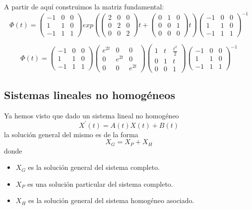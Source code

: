\begin{example}
A partir de aquí construimos la matriz fundamental:
$$\Phi(t) = \begin{pmatrix}
-1 & 0 & 0\\ 1 & 1 & 0\\-1& 1& 1
\end{pmatrix}exp(\begin{pmatrix}
2 & 0 & 0\\ 0 & 2 & 0\\0& 0& 2
\end{pmatrix}t+\begin{pmatrix}
0 & 1 & 0\\ 0 & 0 & 1\\0& 0& 0
\end{pmatrix}t)\begin{pmatrix}
-1 & 0 & 0\\ 1 & 1 & 0\\-1& 1& 1
\end{pmatrix}^{-1}$$

$$\Phi(t) = \begin{pmatrix}
-1 & 0 & 0\\ 1 & 1 & 0\\-1& 1& 1
\end{pmatrix}\begin{pmatrix}
e^{2t} & 0 & 0\\ 0 & e^{2t} & 0\\0& 0& e^{2t}
\end{pmatrix}\begin{pmatrix}
1 & t & \frac{t^2}{2}\\ 0 & 1 & t\\ 0 & 0 & 1
\end{pmatrix}\begin{pmatrix}
-1 & 0 & 0\\ 1 & 1 & 0\\-1& 1& 1
\end{pmatrix}^{-1}$$

\end{example}

\subsection{Sistemas lineales no homogéneos}
Ya hemos visto que dado un sistema lineal no homogéneo $$X^\prime(t) = A(t)X(t)+B(t)$$ la solución general del mismo es de la forma $$X_G = X_P + X_H$$ donde \begin{itemize}
\item $X_G$ es la solución general del sistema completo.

\item $X_P$ es una solución particular del sistema completo.

\item $X_H$ es la solución general del sistema homogéneo asociado.
\end{itemize}

